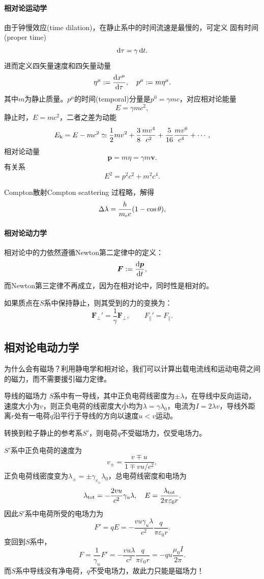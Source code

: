 \paragraph{相对论运动学}
由于钟慢效应(time dilation)，在静止系中的时间流速是最慢的，可定义
固有时间(proper time)
\[
    \mathop{}\!\mathrm{d}\tau=\gamma\mathop{}\!\mathrm{d} t.
\]
进而定义四矢量速度和四矢量动量
\begin{equation}
    \eta^\mu:=\frac{\mathrm{d}^{\;\!\!}x^\mu}{\mathrm{d} \tau^{\;\!\!}},\quad p^\mu:=m\eta^\mu.
\end{equation}
其中$m$为静止质量。$p^\mu$的时间(temporal)分量是$p^0=\gamma mc$，对应相对论能量
\[
    E=\gamma mc^2,
\]
静止时，$E=mc^2$，二者之差为动能
\[
    E_{\mathrm k}=E-mc^2\simeq\frac12mv^2+\frac38\frac{mv^4}{c^2}+\frac5{16}\frac{mv^6}{c^4}+\cdots,
\]
相对论动量
\[
    \bm p=m\eta=\gamma m\bm v.
\]
有关系
\begin{equation}
    E^2=p^2c^2+m^2c^4.
\end{equation}
\begin{example}{Compton散射}{Compton scattering}
    过程略，解得
    \[
        \Delta\lambda=\frac h{m_\mathrm e c}(1-\cos\theta),
    \]
\end{example}
\paragraph{相对论动力学}
相对论中的力依然遵循Newton第二定律中的定义：
\[
    \bm F:=\frac{\mathrm{d}^{\;\!\!}\bm p}{\mathrm{d} t^{\;\!\!}},
\]
而Newton第三定律不再成立，因为在相对论中，同时性是相对的。

如果质点在$S$系中保持静止，则其受到的力的变换为：
\begin{equation}
    \bm F_\perp'=\frac1\gamma\bm F_\perp,\qquad F_\parallel'=F_\parallel.
\end{equation}
\subsection{相对论电动力学}
为什么会有磁场？利用静电学和相对论，我们可以计算出载电流线和运动电荷之间的磁力，而不需要援引磁力定律。
\begin{example}{导线的磁场力}{}
    $S$系中有一导线，其中正负电荷线密度为$\pm\lambda$，在导线中反向运动，速度大小为$v$，则正负电荷的线密度大小均为$\lambda=\gamma\lambda_0$，电流为$I=2\lambda v$，导线外距离$r$处有一电荷$q$沿平行于导线的方向以速度$u<v$运动。


    转换到粒子静止的参考系$S'$，则电荷$q$不受磁场力，仅受电场力。
    
    $S'$系中正负电荷的速度为
    \[
        v_\pm=\frac{v\mp u}{1\mp vu/c^2},
    \]
    正负电荷线密度变为$\lambda_\pm=\pm\gamma_{v_\pm}\lambda_0$，总电荷线密度和电场为
    \[
        \lambda_\mathrm{tot}=-\frac{2vu}{c^2}\gamma_u\lambda,\quad E=\frac{\lambda_\mathrm{tot}}{2\pi\varepsilon_0r}.
    \]
    因此$S'$系中电荷所受的电场力为
    \[
        F'=qE=-\frac{vu\gamma_u\lambda}{c^2}\frac q{\pi\varepsilon_0r}.
    \]
    变回到$S$系中，
    \[
        F=\frac1{\gamma_u}F'=-\frac{vu\lambda}{c^2}\frac q{\pi\varepsilon_0r}=-qu\frac{\mu_0I}{2\pi}.
    \]
    而$S$系中导线没有净电荷，$q$不受电场力，故此力只能是磁场力！
\end{example}
